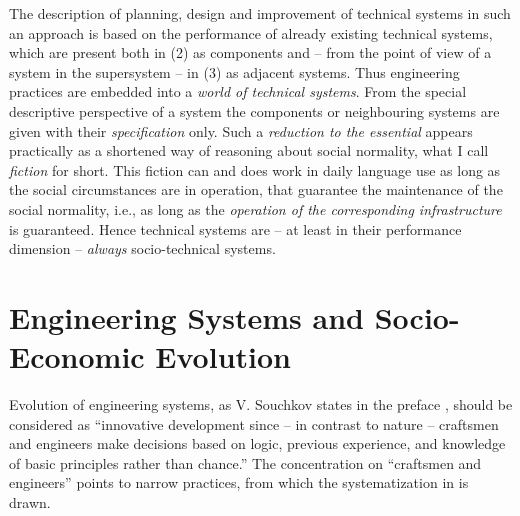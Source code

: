 \documentclass{llncs}
\begin{document}
The description of planning, design and improvement of technical systems in
such an approach is based on the performance of already existing technical
systems, which are present both in (2) as components and -- from the point of
view of a system in the supersystem -- in (3) as adjacent systems.  Thus
engineering practices are embedded into a \emph{world of technical systems}.
From the special descriptive perspective of a system the components or
neighbouring systems are given with their \emph{specification} only. Such a
\emph{reduction to the essential} appears practically as a shortened way of
reasoning about social normality, what I call \emph{fiction} for short. This
fiction can and does work in daily language use as long as the social
circumstances are in operation, that guarantee the maintenance of the social
normality, i.e., as long as the \emph{operation of the corresponding
  infrastructure} is guaranteed.  Hence technical systems are -- at least in
their performance dimension -- \emph{always} socio-technical systems.

\section{Engineering Systems and Socio-Economic Evolution}

Evolution of engineering systems, as V. Souchkov states in the preface
\cite[p. IX]{TESE2018}, should be considered as ``innovative development since
-- in contrast to nature -- craftsmen and engineers make decisions based on
logic, previous experience, and knowledge of basic principles rather than
chance.'' The concentration on ``craftsmen and engineers'' points to narrow
practices, from which the systematization in \cite{TESE2018} is drawn.
\end{document}
